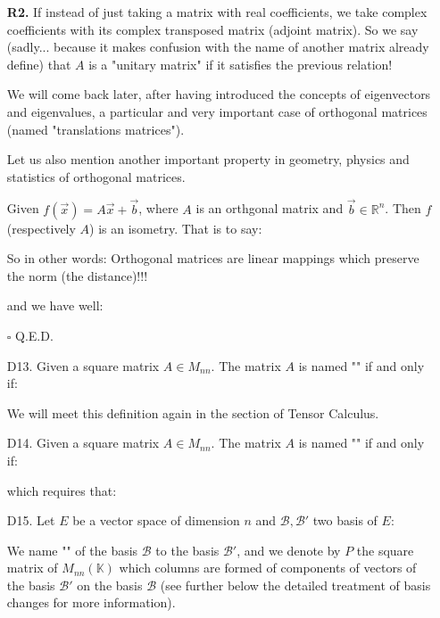 \begin{enumerate}
\begin{tcolorbox}[title=Remarks,colframe=black,arc=10pt]
		\textbf{R2.} If instead of just taking a matrix with real coefficients, we take complex coefficients with its complex transposed matrix (adjoint matrix). So we say (sadly... because it makes confusion with the name of another matrix already define) that $A$ is a "unitary matrix" if it satisfies the previous relation!
		\end{tcolorbox}
		We will come back later, after having introduced the concepts of eigenvectors and eigenvalues, a particular and very important case of orthogonal matrices (named "translations matrices").
		
		Let us also mention another important property in geometry, physics and statistics of orthogonal matrices.
		
		\begin{theorem}
		Given $f(\vec{x})=A\vec{x}+\vec{b}$, where $A$ is an orthgonal matrix and $\vec{b}\in \mathbb{R}^n$. Then $f$ (respectively $A$) is an isometry. That is to say:
		
		So in other words: Orthogonal matrices are linear mappings which preserve the norm (the distance)!!!
		\end{theorem}
		\begin{dem}
		
		and we have well:
		
		\begin{flushright}
			$\square$  Q.E.D.
		\end{flushright}
		\end{dem}
		
		\item[D13.] Given a square matrix $A \in M_{nn}$. The matrix $A$ is named "\label{symmetric matrix}" if and only if:
		
		We will meet this definition again in the section of Tensor Calculus.
		
		\item[D14.] Given a square matrix $A \in M_{nn}$. The matrix $A$ is named "" if and only if:
		
		which requires that:
		
		
		\item[D15.] Let $E$ be a vector space of dimension $n$ and $ \mathcal{B},\mathcal{B}'$ two basis of $E$:
		
		We name "" of the basis $\mathcal{B}$ to the basis  $\mathcal{B}'$, and we denote by $P$ the square matrix of $M_{nn}(\mathbb{K})$ which columns are formed of components of vectors of the basis $\mathcal{B}'$ on the basis $\mathcal{B}$ (see further below the detailed treatment of basis changes for more information).
		

\end{enumerate}

